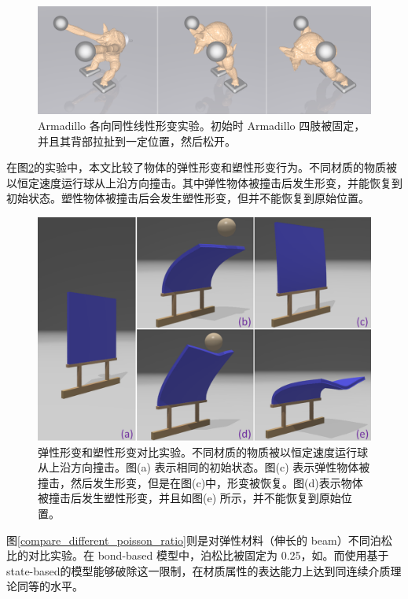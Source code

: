 \begin{figure}[!htb]
  \centering
  \captionsetup{justification=centering}
  \includegraphics[width=0.9\linewidth]{chap/image/demo_pull_armadillo}

  \caption{\label{demo_pull_armadillo}
           Armadillo 各向同性线性形变实验。初始时 Armadillo 四肢被固定，并且其背部拉扯到一定位置，然后松开。
          }
\end{figure}

在图\ref{demo_impact_upside}的实验中，本文比较了物体的弹性形变和塑性形变行为。不同材质的物质被以恒定速度运行球从上沿方向撞击。其中弹性物体被撞击后发生形变，并能恢复到初始状态。塑性物体被撞击后会发生塑性形变，但并不能恢复到原始位置。

\begin{figure}[!htb]
  \centering
  \captionsetup{justification=centering}
  \includegraphics[width=0.7\linewidth]{chap/image/demo_impact_upside}

  \caption{\label{demo_impact_upside}
           弹性形变和塑性形变对比实验。不同材质的物质被以恒定速度运行球从上沿方向撞击。图(a) 表示相同的初始状态。图(c) 表示弹性物体被撞击，然后发生形变，但是在图(c)中，形变被恢复。图(d)表示物体被撞击后发生塑性形变，并且如图(e) 所示，并不能恢复到原始位置。
          }
\end{figure}

图\ref{compare_different_poisson_ratio}则是对弹性材料（伸长的 beam）不同泊松比的对比实验。在 bond-based 模型中，泊松比被固定为 0.25，如。而使用基于 state-based的模型能够破除这一限制，在材质属性的表达能力上达到同连续介质理论同等的水平。

